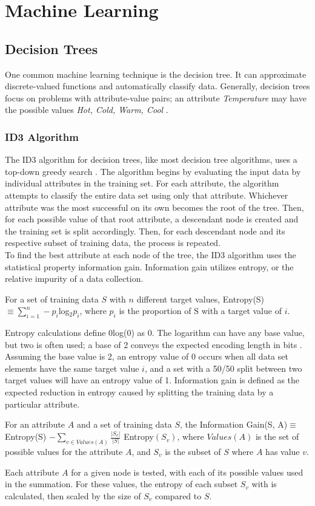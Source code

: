 \chapter{Machine Learning}
\section{Decision Trees}
One common machine learning technique is the decision tree. It can approximate discrete-valued functions \cite{mitc97} and automatically classify data\cite{sega07}. Generally, decision trees focus on problems with attribute-value pairs; an attribute \textit{Temperature} may have the possible values \textit{ Hot, Cold, Warm, Cool} \cite{mitc97}.

\subsection{ID3 Algorithm}
The ID3 algorithm for decision trees, like most decision tree algorithms, uses a top-down greedy search \cite{mitc97}. The algorithm begins by evaluating the input data by individual attributes in the training set. For each attribute, the algorithm attempts to classify the entire data set using only that attribute. Whichever attribute was the most successful on its own becomes the root of the tree. Then, for each possible value of that root attribute, a descendant node is created and the training set is split accordingly. Then, for each descendant node and its respective subset of training data, the process is repeated.\\

To find the best attribute at each node of the tree, the ID3 algorithm uses the statistical property information gain. Information gain utilizes entropy, or the relative impurity of a data collection.
\begin{define}
  For a set of training data $S$ with $n$ different target values, Entropy(S)$\equiv\sum_{i=1}^n-p_i$log$_2p_i$, where $p_i$ is the proportion of S with a target value of $i$.
\end{define}
Entropy calculations define 0log(0) as 0. The logarithm can have any base value, but two is often used; a base of 2 conveys the expected encoding length in bits \cite{mitc97}. Assuming the base value is 2, an entropy value of 0 occurs when all data set elements have the same target value $i$, and a  set with a 50/50 split between two target values will have an entropy value of 1. Information gain is defined as the expected reduction in entropy caused by splitting the training data by a particular attribute.
\begin{define}
  For an attribute $A$ and a set of training data $S$, the Information Gain(S, A)$\equiv$ Entropy(S) $-\sum_{v\in Values(A)}\frac{|S_v|}{|S|}$ Entropy$(S_v)$, where $Values(A)$ is the set of possible values for the attribute $A$, and $S_v$ is the subset of $S$ where $A$ has value $v$.
\end{define}
Each attribute $A$ for a given node is tested, with each of its possible values used in the summation. For these values, the entropy of each subset $S_v$ with is calculated, then scaled by the size of $S_v$ compared to $S$.

